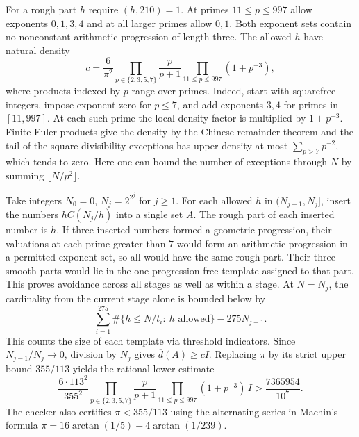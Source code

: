 For a rough part $h$ require $(h,210)=1$. At primes $11\le p\le997$
allow exponents $0,1,3,4$ and at all larger primes allow $0,1$.
Both exponent sets contain no nonconstant arithmetic progression of
length three. The allowed $h$ have natural density
\[
 c=\frac{6}{\pi^2}\prod_{p\in\{2,3,5,7\}}\frac{p}{p+1}
          \prod_{11\le p\le997}(1+p^{-3}),
\]
where products indexed by $p$ range over primes. Indeed, start with
squarefree integers, impose exponent zero for $p\le7$, and add exponents
$3,4$ for primes in $[11,997]$. At each such prime the local density
factor is multiplied by $1+p^{-3}$. Finite Euler products give the
density by the Chinese remainder theorem and the tail of the
square-divisibility exceptions has upper density at most
$\sum_{p>Y}p^{-2}$, which tends to zero. Here one can bound the
number of exceptions through $N$ by summing $\lfloor N/p^2\rfloor$.

Take integers $N_0=0$, $N_j=2^{2^j}$ for $j\ge1$.
For each allowed $h$ in $(N_{j-1},N_j]$, insert the numbers
$h C(N_j/h)$ into a single set $A$. The rough part of each inserted
number is $h$. If three inserted numbers formed a geometric progression,
their valuations at each prime greater than $7$ would form an
arithmetic progression in a permitted exponent set, so all would have
the same rough part. Their three smooth parts would lie in the one
progression-free template assigned to that part. This proves avoidance
across all stages as well as within a stage. At $N=N_j$, the cardinality
from the current stage alone is bounded below by
\[
  \sum_{i=1}^{275}\#\{h\le N/t_i:\ h\text{ allowed}\}-275N_{j-1}.
\]
This counts the size of each template via threshold indicators. Since
$N_{j-1}/N_j\to0$, division by $N_j$ gives
$\overline d(A)\ge cI$. Replacing $\pi$ by its strict upper bound
$355/113$ yields the rational lower estimate
\[
 \frac{6\cdot113^2}{355^2}
 \prod_{p\in\{2,3,5,7\}}\frac p{p+1}
 \prod_{11\le p\le997}(1+p^{-3})\,I
   >\frac{7365954}{10^7}.
\]
The checker also certifies $\pi<355/113$ using the alternating series in Machin's formula $\pi=16\arctan(1/5)-4\arctan(1/239)$.

